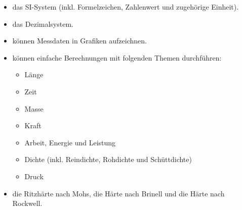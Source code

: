 \begin{itemize}[noitemsep]
	\item das SI-System (inkl. Formelzeichen, Zahlenwert und zugehörige Einheit).
	\item das Dezimalsystem. 
	\item können Messdaten in Grafiken aufzeichnen. 
	\item können einfache Berechnungen mit folgenden Themen durchführen: 
	\begin{itemize}[noitemsep]
		\item Länge
		\item Zeit 
		\item Masse 
		\item Kraft 
		\item Arbeit, Energie und Leistung 
		\item Dichte (inkl. Reindichte, Rohdichte und Schüttdichte) 
		\item Druck
	\end{itemize}
	\item die Ritzhärte nach Mohs, die Härte nach Brinell und die Härte nach Rockwell.
\end{itemize}